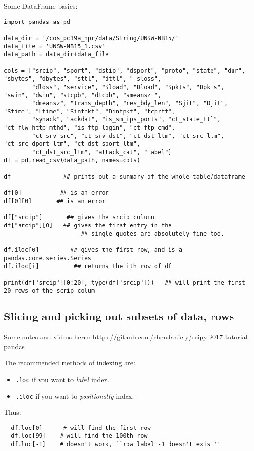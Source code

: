 \documentclass[11pt,a4paper]{article}
\begin{document}
\smallskip
\smallskip
\noindent 
Some DataFrame basics:
\begin{lstlisting}
import pandas as pd

data_dir = '/cos_pc19a_npr/data/String/UNSW-NB15/'
data_file = 'UNSW-NB15_1.csv'
data_path = data_dir+data_file

cols = ["srcip", "sport", "dstip", "dsport", "proto", "state", "dur", "sbytes", "dbytes", "sttl", "dttl", " sloss", 
        "dloss", "service", "Sload", "Dload", "Spkts", "Dpkts", "swin", "dwin", "stcpb", "dtcpb", "smeansz ", 
        "dmeansz", "trans_depth", "res_bdy_len", "Sjit", "Djit", "Stime", "Ltime", "Sintpkt", "Dintpkt", "tcprtt", 
        "synack", "ackdat", "is_sm_ips_ports", "ct_state_ttl", "ct_flw_http_mthd", "is_ftp_login", "ct_ftp_cmd",
        "ct_srv_src", "ct_srv_dst", "ct_dst_ltm", "ct_src_ltm", "ct_src_dport_ltm", "ct_dst_sport_ltm", 
        "ct_dst_src_ltm", "attack_cat", "Label"]
df = pd.read_csv(data_path, names=cols)

df               ## prints out a summary of the whole table/dataframe

df[0]           ## is an error
df[0][0]       ## is an error

df["srcip"]       ## gives the srcip column
df["srcip"][0]   ## gives the first entry in the  
                      ## single quotes are absolutely fine too. 

df.iloc[0]         ## gives the first row, and is a pandas.core.series.Series
df.iloc[i]          ## returns the ith row of df

print(df['srcip'][0:20], type(df['srcip']))   ## will print the first 20 rows of the scrip colum
\end{lstlisting}




\newpage
\subsection{Slicing and picking out subsets of data, rows}

Some notes and videos here::
\href{https://github.com/chendaniely/scipy-2017-tutorial-pandas}{https://github.com/chendaniely/scipy-2017-tutorial-pandas}

The recommended methods of indexing are:
\begin{itemize}
\item{{\tt .loc} if you want to {\it label} index.}
\item{{\tt .iloc} if you want to {\it positionally} index.}
\end{itemize}
Thus:
\begin{lstlisting}
  df.loc[0]      # will find the first row
  df.loc[99]    # will find the 100th row
  df.loc[-1]    # doesn't work, ``row label -1 doesn't exist''
\end{lstlisting}
\end{document}
